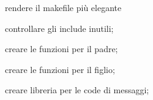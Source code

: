 
\begin{DoxyItemize}
\item rendere il makefile più elegante
\item controllare gli include inutili;
\item creare le funzioni per il padre;
\item creare le funzioni per il figlio;
\item creare libreria per le code di messaggi; 
\end{DoxyItemize}